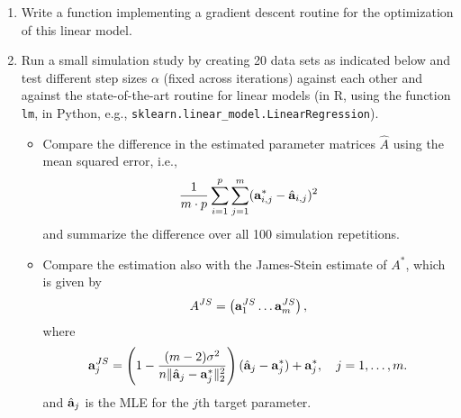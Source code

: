 \documentclass[a4paper]{article}
\begin{document}
{\begin{enumerate}
\begin{align*}
		&\frac{\partial \bm{z}^\top \bm{B} \bm{C} \bm{B}^\top \tilde{\bm{z}} }{\partial  \bm{B} } 
		= 2 \bm{z} \tilde{\bm{z}}^\top \bm{B} \bm{C}^\top  , \qquad \forall \bm{z}\in\R^n,\tilde{\bm{z}}\in \R^{m}, \bm{B}\in\R^{n \times m}, \bm{C} \in \R^{n \times n}.
	\end{align*}
	Moreover, any matrix product $\Xmat^\top Y$ can be written as the sum of outer products of the column and row vectors: $ \sum_{i=1}^n    \xi \yv^{(i)}.$
	Thus, the MLE coincides with the OLS in (a).		
	\item Write a function implementing a gradient descent routine for the optimization of this linear model.
	 \item Run a small simulation study by creating 20 data sets as indicated below and test different step sizes $\alpha$ (fixed across iterations) against each other and against the state-of-the-art routine for linear models (in R, using the function \texttt{lm}, in Python, e.g., \texttt{sklearn.linear\_model.LinearRegression}).
  \begin{itemize}
    \item Compare the difference in the estimated parameter matrices $\hat A$ using the mean squared error, i.e., 
    $$ \frac{1}{m\cdot p} \sum_{i=1}^p \sum_{j=1}^m (\mathbf{a}^{*}_{i,j}-\hat{\mathbf{a}}_{i,j})^2$$ 
    and summarize the difference over all 100 simulation repetitions.
    \item Compare the estimation also with the James-Stein estimate of $A^*$, which is given by 
	$$  A^{JS} = \left(  \mathbf{a}_1^{JS} \ldots \mathbf{a}_m^{JS}  \right),$$
	where $$  \mathbf{a}_j^{JS} = \left (1 - \frac{(m-2)\sigma^2}{n\|\hat{\mathbf{a}}_j - \mathbf{a}_j^* \|^2_2} \right )  (\hat{\mathbf{a}}_j - \mathbf{a}_j^*) + \mathbf{a}_j^*, \quad j=1,\ldots,m.$$
	and $\hat{\mathbf{a}}_j$ is the MLE for the $j$th target parameter.
    \end{itemize}

\end{enumerate}

}
\end{document}
